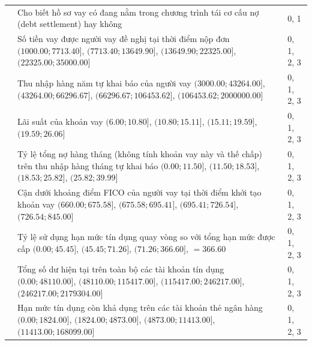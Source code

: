 \begin{longtable}{V{2.6cm}D{9.0cm}S{3.0cm}}
     & Cho biết hồ sơ vay có đang nằm trong chương trình tái cơ cấu nợ (debt settlement) hay không & 0, 1 \\
 
     & Số tiền vay được người vay đề nghị tại thời điểm nộp đơn \newline $(1000.00; 7713.40]$, $(7713.40; 13649.90]$, $(13649.90; 22325.00]$, $(22325.00; 35000.00]$ & 0, 1, 2, 3 \\
 
     & Thu nhập hàng năm tự khai báo của người vay \newline $(3000.00; 43264.00]$, $(43264.00; 66296.67]$, $(66296.67; 106453.62]$, $(106453.62; 2000000.00]$ & 0, 1, 2, 3 \\
 
     & Lãi suất của khoản vay \newline $(6.00; 10.80]$, $(10.80; 15.11]$, $(15.11; 19.59]$, $(19.59; 26.06]$ & 0, 1, 2, 3 \\
 
     & Tỷ lệ tổng nợ hàng tháng (không tính khoản vay này và thế chấp) trên thu nhập hàng tháng tự khai báo \newline $(0.00; 11.50]$, $(11.50; 18.53]$, $(18.53; 25.82]$, $(25.82; 39.99]$ & 0, 1, 2, 3 \\
 
     & Cận dưới khoảng điểm FICO của người vay tại thời điểm khởi tạo khoản vay \newline $(660.00; 675.58]$, $(675.58; 695.41]$, $(695.41; 726.54]$, $(726.54; 845.00]$ & 0, 1, 2, 3 \\
 
     & Tỷ lệ sử dụng hạn mức tín dụng quay vòng so với tổng hạn mức được cấp \newline $(0.00; 45.45]$, $(45.45; 71.26]$, $(71.26; 366.60]$, $= 366.60$ & 0, 1, 2, 3 \\
 
     & Tổng số dư hiện tại trên toàn bộ các tài khoản tín dụng \newline $(0.00; 48110.00]$, $(48110.00; 115417.00]$, $(115417.00; 246217.00]$, $(246217.00; 2179304.00]$ & 0, 1, 2, 3 \\
 
     & Hạn mức tín dụng còn khả dụng trên các tài khoản thẻ ngân hàng \newline $(0.00; 1824.00]$, $(1824.00; 4873.00]$, $(4873.00; 11413.00]$, $(11413.00; 168099.00]$ & 0, 1, 2, 3 \\
 

\end{longtable}
